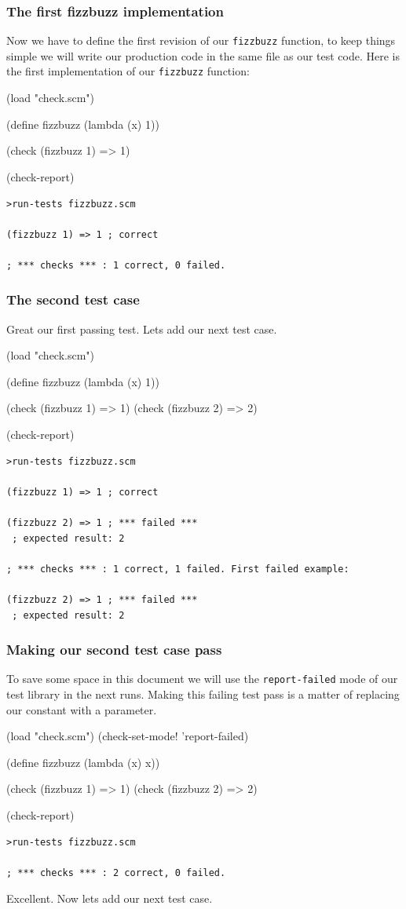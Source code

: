 \documentclass[12pt,a4paper,english,twoside]{article}
\begin{document}
\subsubsection{The first fizzbuzz implementation}
Now we have to define the first revision of our \texttt{fizzbuzz} function, 
to keep things simple we will write our production code in the same file as 
our test code. Here is the first implementation of our \texttt{fizzbuzz} 
function:
\begin{schemecode}
(load "check.scm")

(define fizzbuzz (lambda (x) 1))

(check (fizzbuzz 1) => 1)

(check-report)
\end{schemecode}
\begin{lstlisting}
>run-tests fizzbuzz.scm

(fizzbuzz 1) => 1 ; correct

; *** checks *** : 1 correct, 0 failed.
\end{lstlisting}
\subsubsection{The second test case}
Great our first passing test. Lets add our next test case.  
\begin{schemecode}
(load "check.scm")

(define fizzbuzz (lambda (x) 1))

(check (fizzbuzz 1) => 1)
(check (fizzbuzz 2) => 2)

(check-report)
\end{schemecode}
\begin{lstlisting}
>run-tests fizzbuzz.scm

(fizzbuzz 1) => 1 ; correct

(fizzbuzz 2) => 1 ; *** failed ***
 ; expected result: 2

; *** checks *** : 1 correct, 1 failed. First failed example:

(fizzbuzz 2) => 1 ; *** failed ***
 ; expected result: 2

\end{lstlisting}
\subsubsection{Making our second test case pass}
To save some space in this document we will use the \texttt{report-failed} 
mode of our test library in the next runs. Making this failing test pass is a 
matter of replacing our constant with a parameter.
\begin{schemecode}
(load "check.scm")
(check-set-mode! 'report-failed)

(define fizzbuzz (lambda (x) x))

(check (fizzbuzz 1) => 1)
(check (fizzbuzz 2) => 2)

(check-report)
\end{schemecode}
\begin{lstlisting}
>run-tests fizzbuzz.scm

; *** checks *** : 2 correct, 0 failed.  
\end{lstlisting}
Excellent. Now lets add our next test case.
\end{document}
